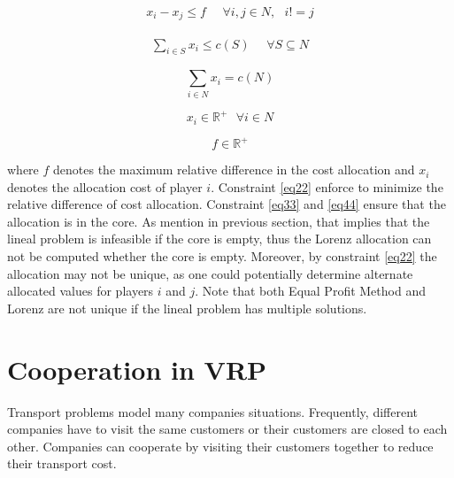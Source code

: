 \begin{equation}\label{eq22}
\begin{split}
x_i - x_j \leq f \textrm{ } \textrm{ } \forall i,j \in N,\textrm{ } i!=j
\end{split}
\end{equation}

\begin{equation}\label{eq33}
\begin{split}
\sum_{i \in S} x_i \leq c(S)\textrm{ }\textrm{ } \forall S \subseteq N
\end{split}
\end{equation}

\begin{equation}\label{eq44}
\sum_{i \in N} x_i  = c(N)
\end{equation}

\begin{equation}\label{eq55}
x_i \in \mathbb{R}^{+} \textrm{ } \forall i \in N
\end{equation}

\begin{equation}\label{eq66}
f \in \mathbb{R}^{+} 
\end{equation}

where $f$ denotes the maximum relative difference in the cost allocation and $x_i$ denotes the allocation cost of player $i$. 
Constraint \ref{eq22} enforce to minimize the relative difference of cost allocation. Constraint \ref{eq33} and \ref{eq44} ensure that the allocation is in the core. As mention in previous section, that implies that the lineal problem is infeasible if the core is empty, thus the Lorenz allocation can not be computed whether the core is empty. Moreover, by constraint \ref{eq22} the allocation may not be unique, as one could potentially determine alternate allocated values for players $i$ and $j$.
Note that both Equal Profit Method and Lorenz are not unique if the lineal problem has multiple solutions.

\section{Cooperation in VRP}\label{GameTheoryCooperation}

Transport problems model many companies situations. Frequently, different companies have to visit the same customers or their customers are closed to each other. Companies can cooperate by visiting their customers together to reduce their transport cost.

